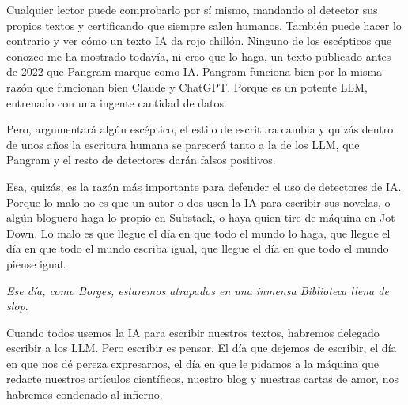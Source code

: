 \documentclass[11pt,a4paper]{article}
\begin{document}
Cualquier lector puede comprobarlo por sí mismo, mandando al detector sus propios textos y certificando que siempre salen humanos. También puede hacer lo contrario y ver cómo un texto IA da rojo chillón. Ninguno de los escépticos que conozco me ha mostrado todavía, ni creo que lo haga, un texto publicado antes de 2022 que Pangram marque como IA. Pangram funciona bien por la misma razón que funcionan bien Claude y ChatGPT. Porque es un potente LLM, entrenado con una ingente cantidad de datos.

Pero, argumentará algún escéptico, el estilo de escritura cambia y quizás dentro de unos años la escritura humana se parecerá tanto a la de los LLM, que Pangram y el resto de detectores darán falsos positivos.

Esa, quizás, es la razón más importante para defender el uso de detectores de IA. Porque lo malo no es que un autor o dos usen la IA para escribir sus novelas, o algún bloguero haga lo propio en Substack, o haya quien tire de máquina en Jot Down. Lo malo es que llegue el día en que todo el mundo lo haga, que llegue el día en que todo el mundo escriba igual, que llegue el día en que todo el mundo piense igual. 

\emph{Ese día, como Borges, estaremos atrapados en una inmensa Biblioteca llena de slop}.

Cuando todos usemos la IA para escribir nuestros textos, habremos delegado escribir a los LLM. Pero escribir es pensar. El día que dejemos de escribir, el día en que nos dé pereza expresarnos, el día en que le pidamos a la máquina que redacte nuestros artículos científicos, nuestro blog y nuestras cartas de amor, nos habremos condenado al infierno.
\end{document}
